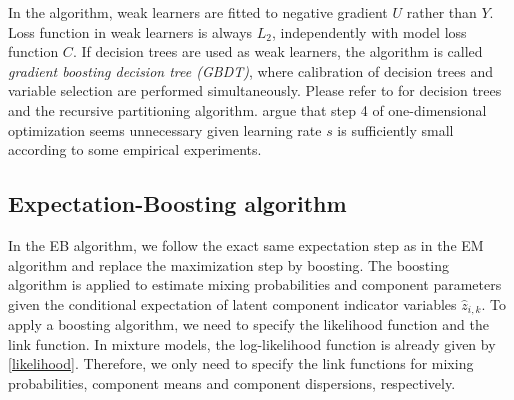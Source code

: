 \documentclass[11pt]{article}
\numberwithin{equation}{section}
\def\bx{\boldsymbol{x}}
\begin{document}
%	

In the algorithm, weak learners are fitted to negative gradient $U$ rather than $Y$.
		 Loss function in weak learners is always $L_2$, independently with model loss function $C$. 
		 If decision trees \citep{breiman1983classification} are used as weak learners, the algorithm is called \textit{gradient boosting decision tree (GBDT)}, where {calibration of decision trees and variable selection} are performed simultaneously.
		 Please refer to \citet{hastie2009elements} for decision trees and the recursive partitioning algorithm.
		\citet{buhlmann2007boosting} argue that step 4 of one-dimensional optimization seems unnecessary given learning rate $s$ is sufficiently small according to some empirical experiments.




\subsection{Expectation-Boosting algorithm}

In the EB algorithm, we follow the exact same expectation step as in the EM algorithm and replace the maximization step by boosting.
The boosting algorithm is applied to estimate mixing probabilities and component parameters given the conditional expectation of latent component indicator variables $\hat{z}_{i,k}$.
To apply a boosting algorithm, we need to specify the likelihood function and the link function.
In mixture models, the log-likelihood function is already given by \eqref{likelihood}.
Therefore, we only need to specify the link functions for mixing probabilities, component means and component dispersions, respectively.
\end{document}
